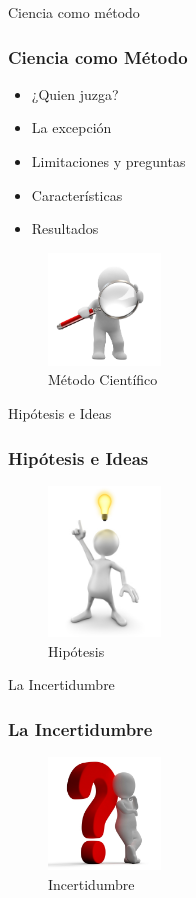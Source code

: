 \documentclass{beamer}
\begin{document}
\begin{frame}{Ciencia como método}
\frametitle{Ciencia como Método}
\begin{multicols}{2}

\begin{itemize}
    \item ¿Quien juzga? 
    \item La excepción 
    \item Limitaciones y preguntas
    \item Características
    \item Resultados
\end{itemize}

\begin{figure}[htp]
        \centering
        \includegraphics[width=3cm]{images/observacion}
        \caption{Método Científico}
    \end{figure}

\end{multicols}
\end{frame}

\begin{frame}{Hipótesis e Ideas}
    \frametitle{Hipótesis e Ideas}
    
    \begin{figure}[htp]
        \centering
        \includegraphics[width=3cm]{images/idea}
        \caption{Hipótesis}
    \end{figure}
    
\end{frame}

\begin{frame}{La Incertidumbre}
    \frametitle{La Incertidumbre}
    
        \begin{figure}[htp]
        \centering
        \includegraphics[width=3cm]{images/duda}
        \caption{Incertidumbre}
    \end{figure}
    
\end{frame}
\end{document}
